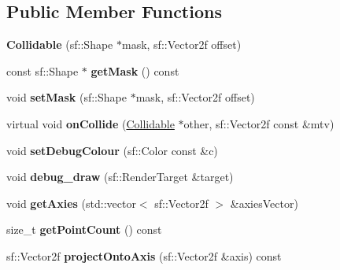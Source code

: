 \subsection*{Public Member Functions}
\begin{DoxyCompactItemize}
\item 
\hypertarget{classcollision_1_1_collidable_aab9ad50a52775297bb3d373f14ba15df}{}{\bfseries Collidable} (sf\+::\+Shape $\ast$mask, sf\+::\+Vector2f offset)\label{classcollision_1_1_collidable_aab9ad50a52775297bb3d373f14ba15df}

\item 
\hypertarget{classcollision_1_1_collidable_a38bac56d0e39176287f159805c3ef93f}{}const sf\+::\+Shape $\ast$ {\bfseries get\+Mask} () const \label{classcollision_1_1_collidable_a38bac56d0e39176287f159805c3ef93f}

\item 
\hypertarget{classcollision_1_1_collidable_a59968e2602832ae42750148e1d9a574a}{}void {\bfseries set\+Mask} (sf\+::\+Shape $\ast$mask, sf\+::\+Vector2f offset)\label{classcollision_1_1_collidable_a59968e2602832ae42750148e1d9a574a}

\item 
\hypertarget{classcollision_1_1_collidable_a1f88bef85869630909cce6d040a6f53a}{}virtual void {\bfseries on\+Collide} (\hyperlink{classcollision_1_1_collidable}{Collidable} $\ast$other, sf\+::\+Vector2f const \&mtv)\label{classcollision_1_1_collidable_a1f88bef85869630909cce6d040a6f53a}

\item 
\hypertarget{classcollision_1_1_collidable_aec61f1b090248e26b4ceaed2ea7ad885}{}void {\bfseries set\+Debug\+Colour} (sf\+::\+Color const \&c)\label{classcollision_1_1_collidable_aec61f1b090248e26b4ceaed2ea7ad885}

\item 
\hypertarget{classcollision_1_1_collidable_a3acb897afe5bedccab5c857f165e6355}{}void {\bfseries debug\+\_\+draw} (sf\+::\+Render\+Target \&target)\label{classcollision_1_1_collidable_a3acb897afe5bedccab5c857f165e6355}

\item 
\hypertarget{classcollision_1_1_collidable_afca4351156e8e146db120e715c420c88}{}void {\bfseries get\+Axies} (std\+::vector$<$ sf\+::\+Vector2f $>$ \&axies\+Vector)\label{classcollision_1_1_collidable_afca4351156e8e146db120e715c420c88}

\item 
\hypertarget{classcollision_1_1_collidable_a10c40bfb76a63c35f468fe0ec2eaf5bd}{}size\+\_\+t {\bfseries get\+Point\+Count} () const \label{classcollision_1_1_collidable_a10c40bfb76a63c35f468fe0ec2eaf5bd}

\item 
\hypertarget{classcollision_1_1_collidable_a66173721be9e04f7bd928db63c22d748}{}sf\+::\+Vector2f {\bfseries project\+Onto\+Axis} (sf\+::\+Vector2f \&axis) const \label{classcollision_1_1_collidable_a66173721be9e04f7bd928db63c22d748}

\end{DoxyCompactItemize}
